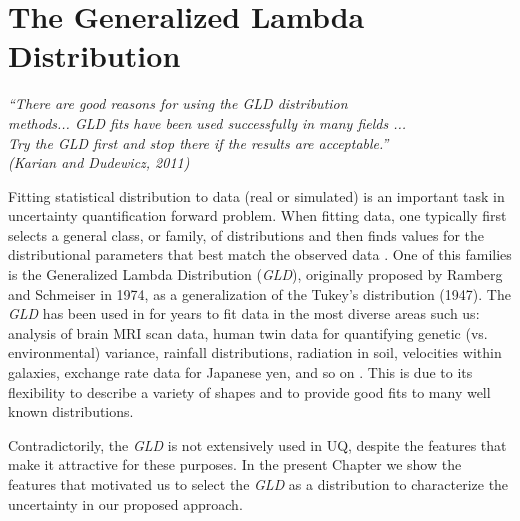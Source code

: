 \chapter[The Generalized Lambda Distribution]{The Generalized Lambda Distribution}\label{cap:gld}

\begin{flushright}
	\textit{``There are good reasons for using the GLD distribution \\
	methods... GLD fits have been used successfully in many fields ...\\
	Try the GLD first and stop there if the results are acceptable.''\\
	(Karian and Dudewicz, 2011)}
\end{flushright}


Fitting statistical distribution to data (real or simulated) is an important task in uncertainty quantification forward problem. When fitting data, one typically first selects a general class, or family, of distributions and then finds values for the distributional parameters that best match the observed data \cite{Lakhany2000}. One of this families is the Generalized Lambda Distribution (\textit{GLD}), originally proposed by Ramberg and Schmeiser in 1974, as a generalization of the Tukey's distribution (1947). The \textit{GLD} has been used in for years to fit data in the most diverse areas such us: analysis of brain MRI scan data, human twin data for quantifying genetic (vs. environmental) variance, rainfall distributions, radiation in soil, velocities within galaxies, exchange rate data for Japanese yen, and so on \cite{Karian2011}. This is due to its flexibility to describe a variety of shapes and to provide good fits to many well known distributions.    

Contradictorily, the \textit{GLD} is not extensively used in UQ, despite the features that make it attractive for these purposes. In the present Chapter we show the features that motivated us to select the \textit{GLD} as a distribution to characterize the uncertainty in our proposed approach.

